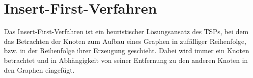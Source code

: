 \section{Insert-First-Verfahren}

Das Insert-First-Verfahren ist ein heuristischer Lösungsansatz des \ac{TSP}s, bei dem das Betrachten der Knoten zum Aufbau eines Graphen in zufälliger Reihenfolge, bzw. in der Reihenfolge ihrer Erzeugung geschieht.
Dabei wird immer ein Knoten betrachtet und in Abhängigkeit von seiner Entfernung zu den anderen Knoten in den Graphen eingefügt.

